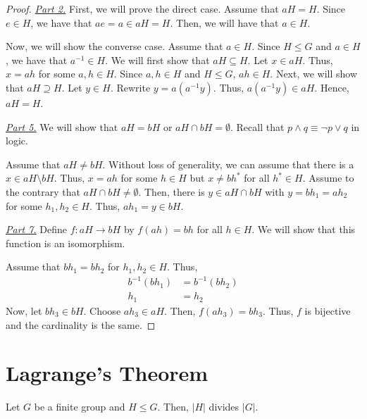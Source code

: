 \begin{proof}
    \textit{\underline{Part 2.}} First, we will prove the direct case. Assume that \(aH = H\). Since \(e \in H\), we have that \(ae = a \in aH = H\). Then, we will have that \(a \in H\).

    Now, we will show the converse case. Assume that \(a \in H\). Since \(H \leq G\) and \(a \in H\), we have that \(a^{-1} \in H\). We will first show that \(aH \subseteq H\). Let \(x \in aH\). Thus, \(x = ah\) for some \(a, h \in H\). Since \(a, h \in H\) and \(H \leq G\), \(ah \in H\). Next, we will show that \(aH \supseteq H\). Let \(y \in H\). Rewrite \(y = a(a^{-1}y)\). Thus, \(a(a^{-1}y) \in aH\). Hence, \(aH = H\).

    \textit{\underline{Part 5.}} We will show that \(aH = bH\) or \(aH \cap bH = \emptyset\). Recall that \(p \land q \equiv \lnot p \lor q\) in logic.

    Assume that \(aH \neq bH\). Without loss of generality, we can assume that there is a \(x \in aH \setminus bH\). Thus, \(x = ah\) for some \(h \in H\) but \(x \neq bh^*\) for all \(h^* \in H\). Assume to the contrary that \(aH \cap bH \neq \emptyset\). Then, there is \(y \in aH \cap bH\) with \(y = bh_1 = ah_2\) for some \(h_1, h_2 \in H\). Thus, \(ah_1 = y \in bH\).

    \textit{\underline{Part 7.}} Define \(f : aH \to bH\) by \(f(ah) = bh\) for all \(h \in H\). We will show that this function is an isomorphism.

    Assume that \(bh_1 = bh_2\) for \(h_1, h_2 \in H\). Thus, 
    \[
    \begin{aligned}
        b^{-1}(bh_1) &= b^{-1}(bh_2) \\
        h_1 &= h_2
    \end{aligned}
    \]
    Now, let \(bh_3 \in bH\). Choose \(ah_3 \in aH\). Then, \(f(ah_3) = bh_3\). Thus, \(f\) is bijective and the cardinality is the same.
\end{proof}

\section{Lagrange's Theorem}

\begin{theorem}
    Let \(G\) be a finite group and \(H \leq G\). Then, \(|H|\) divides \(|G|\).
\end{theorem}

